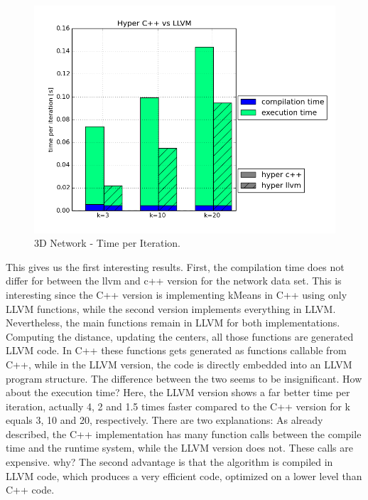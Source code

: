 \begin{figure}[htsb]
  \centering
  \includegraphics[scale=0.4, trim="0cm 1.5cm 0cm 0cm"]{figures/charts/hyper_network}
  \caption[3D Network - Time per Iteration]{3D Network - Time per Iteration.}
  \label{fig:hyper_network}
\end{figure}


This gives us the first interesting results. First, the compilation time does not differ for between the llvm and c++ version for the network data set. This is interesting since the C++ version is implementing kMeans in C++ using only LLVM functions, while the second version implements everything in LLVM. 
Nevertheless, the main functions remain in LLVM for both implementations. Computing the distance, updating the centers, all those functions are generated LLVM code. In C++ these functions gets generated as functions callable from C++, while in the LLVM version, the code is directly embedded into an LLVM program structure. The difference between the two seems to be insignificant.
How about the execution time? Here, the LLVM version shows a far better time per iteration, actually 4, 2 and 1.5 times faster compared to the C++ version for k equals 3, 10 and 20, respectively. There are two explanations: As already described, the C++ implementation has many function calls between the compile time and the runtime system, while the LLVM version does not. These calls are expensive. why?
The second advantage is that the algorithm is compiled in LLVM code, which produces a very efficient code, optimized on a lower level than C++ code.


